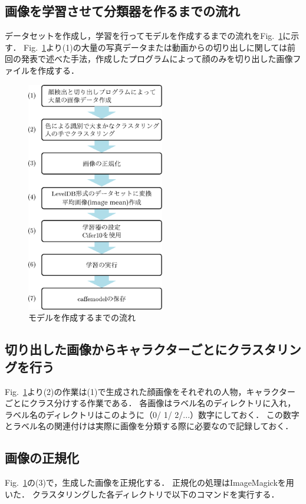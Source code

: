 \documentclass[a4paper,10pt]{jsarticle}
\begin{document}
\subsection{画像を学習させて分類器を作るまでの流れ}
データセットを作成し，学習を行ってモデルを作成するまでの流れをFig.~\ref{fig:モデルを作成するまでの流れ}に示す．
Fig.~\ref{fig:モデルを作成するまでの流れ}より(1)の大量の写真データまたは動画からの切り出しに関しては前回の発表で述べた手法，作成したプログラムによって顔のみを切り出した画像ファイルを作成する．
\begin{figure}[tb]
  \begin{center}
    \includegraphics[clip,width=6cm]{fig/eps/learning_flow.eps}
  \end{center}
  \caption{モデルを作成するまでの流れ}
  \label{fig:モデルを作成するまでの流れ}
\end{figure}

\subsection{切り出した画像からキャラクターごとにクラスタリングを行う}
Fig.~\ref{fig:モデルを作成するまでの流れ}より(2)の作業は(1)で生成された顔画像をそれぞれの人物，キャラクターごとにクラス分けする作業である．
各画像はラベル名のディレクトリに入れ，ラベル名のディレクトリはこのように（0/ 1/ 2/...）数字にしておく．
この数字とラベル名の関連付けは実際に画像を分類する際に必要なので記録しておく．

\subsection{画像の正規化}
Fig.~\ref{fig:モデルを作成するまでの流れ}の(3)で，生成した画像を正規化する．
正規化の処理はImageMagickを用いた．
クラスタリングした各ディレクトリで以下のコマンドを実行する．
\end{document}
